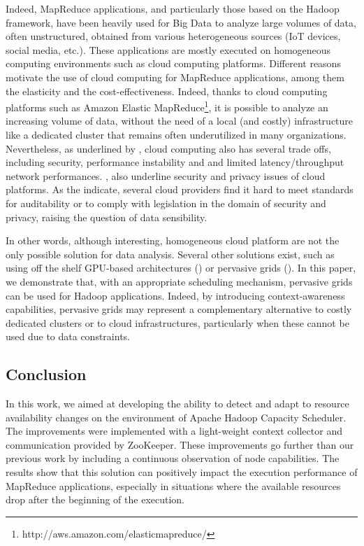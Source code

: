 Indeed, MapReduce applications, and particularly those based on the Hadoop framework, have been heavily used for Big Data to analyze large volumes of data, often unstructured, obtained from various heterogeneous sources (IoT devices, social media, etc.). These applications are mostly executed on homogeneous computing environments such as cloud computing platforms. Different reasons motivate the use of cloud computing for MapReduce applications, among them the elasticity and the cost-effectiveness. Indeed, thanks to cloud computing platforms such as Amazon Elastic MapReduce\footnote{http://aws.amazon.com/elasticmapreduce/}, it is possible to analyze an increasing volume of data, without the need of a local (and costly) infrastructure like a dedicated cluster that remains often underutilized in many organizations. Nevertheless, as underlined by \cite{Hofmann2010}, cloud computing also has several trade offs, including security, performance instability and and limited latency/throughput network performances.  \cite{Hofmann2010}, \cite{Schadt2010} also underline security and privacy issues of cloud platforms. As the indicate, several cloud providers find it hard to meet standards for auditability or to comply with legislation in the domain of security and privacy, raising the question of data sensibility. 

In other words, although interesting, homogeneous cloud platform are not the only possible solution for data analysis. Several other solutions exist, such as using off the shelf GPU-based architectures (\cite{Engel2015}) or pervasive grids (\cite{Steffenel20151034}). In this paper, we demonstrate that, with an appropriate scheduling mechanism, pervasive grids can be used for Hadoop  applications. Indeed, by introducing context-awareness capabilities, pervasive grids may represent a complementary alternative to costly dedicated clusters or to cloud infrastructures, particularly when these cannot be used due to data constraints. 


\subsection{Conclusion} \label{sec:concl}
In this work, we aimed at developing the ability to detect and adapt to resource availability changes on the environment of Apache Hadoop Capacity Scheduler. The improvements were implemented with a light-weight context collector and communication provided by ZooKeeper. These improvements go further than our previous work \cite{UBICOMM2014} by including a continuous observation of node capabilities.  
The results show that this solution can positively impact the execution performance of MapReduce applications, especially in situations where the available resources drop after the beginning of the execution. 

